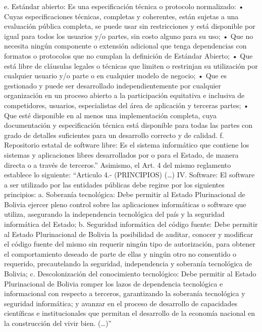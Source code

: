 e. Estándar abierto: Es una especificación técnica o protocolo normalizado: 
• Cuyas especificaciones técnicas, completas y coherentes, están sujetas a una evaluación pública completa, se puede usar sin restricciones y está disponible por igual para todos los usuarios y/o partes, sin costo alguno para su uso; 
• Que no necesita ningún componente o extensión adicional que tenga dependencias con formatos o protocolos que no cumplan la definición de Estándar Abierto; 
• Que está libre de cláusulas legales o técnicas que limiten o restrinjan su utilización por cualquier usuario y/o parte o en cualquier modelo de negocio;
 • Que es gestionado y puede ser desarrollado independientemente por cualquier organización en un proceso abierto a la participación equitativa e inclusiva de competidores, usuarios, especialistas del área de aplicación y terceras partes;
 • Que esté disponible en al menos una implementación completa, cuya documentación y especificación técnica está disponible para todas las partes con grado de detalles suficientes para un desarrollo correcto y de calidad. 
f. Repositorio estatal de software libre: Es el sistema informático que contiene los sistemas y aplicaciones libres desarrollados por o para el Estado, de manera directa o a través de terceros.”
Asimismo, el Art. 4 del mismo reglamento establece lo siguiente: “Articulo 4.- (PRINCIPIOS) (…) IV. Software: El software a ser utilizado por las entidades públicas debe regirse por los siguientes principios: a. Soberanía tecnológica: Debe permitir al Estado Plurinacional de Bolivia ejercer pleno control sobre las aplicaciones informáticas o software que utiliza, asegurando la independencia tecnológica del país y la seguridad informática del Estado; b. Seguridad informática del código fuente: Debe permitir al Estado Plurinacional de Bolivia la posibilidad de auditar, conocer y modificar el código fuente del mismo sin requerir ningún tipo de autorización, para obtener el comportamiento deseado de parte de ellas y ningún otro no consentido o requerido, precautelando la seguridad, independencia y soberanía tecnológica de Bolivia; c. Descolonización del conocimiento tecnológico: Debe permitir al Estado Plurinacional de Bolivia romper los lazos de dependencia tecnológica e informacional con respecto a terceros, garantizando la soberanía tecnológica y seguridad informática; y avanzar en el proceso de desarrollo de capacidades científicas e institucionales que permitan el desarrollo de la economía nacional en la construcción del vivir bien. (…)”
